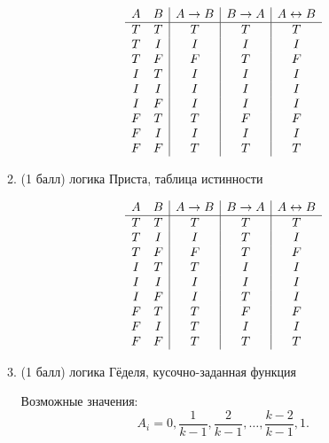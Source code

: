\begin{enumerate}
\begin{enumerate}
    \begin{solution}
      \begin{displaymath}
      \begin{array}{c c|c|c|c}
        A & B & A \rightarrow B & B \rightarrow A & A \leftrightarrow B\\
        \hline
        T & T & T & T & T\\
        T & I & I & I & I\\
        T & F & F & T & F\\
        I & T & I & I & I\\
        I & I & I & I & I\\
        I & F & I & I & I\\
        F & T & T & F & F\\
        F & I & I & I & I\\
        F & F & T & T & T
      \end{array}
      \end{displaymath}
    \end{solution}
    \item (1 балл) логика Приста, таблица истинности
    \begin{solution}
      \begin{displaymath}
      \begin{array}{c c|c|c|c}
        A & B & A \rightarrow B & B \rightarrow A & A \leftrightarrow B\\
        \hline
        T & T & T & T & T\\
        T & I & I & T & I\\
        T & F & F & T & F\\
        I & T & T & I & I\\
        I & I & I & I & I\\
        I & F & I & T & I\\
        F & T & T & F & F\\
        F & I & T & I & I\\
        F & F & T & T & T
      \end{array}
      \end{displaymath}
    \end{solution}
    \item (1 балл) логика Гёделя, кусочно-заданная функция
    \begin{solution}
      Возможные значения:
      \begin{equation}
        A_i = 0, \frac{1}{k-1}, \frac{2}{k-1}, \dots, \frac{k-2}{k-1}, 1.
      \end{equation}

\end{solution}
\end{enumerate}
\end{enumerate}
